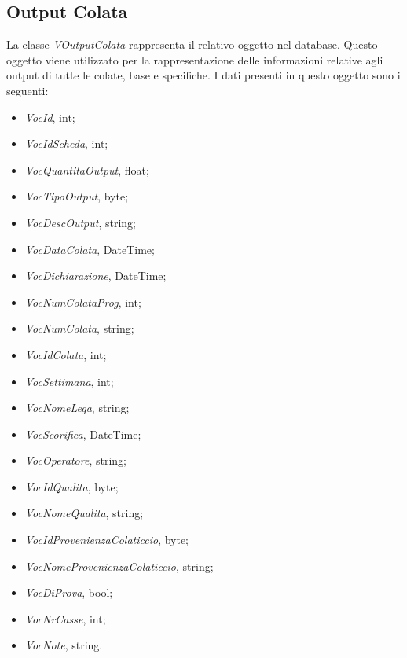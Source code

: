   \subsection{Output Colata}
  La classe \textit{VOutputColata} rappresenta il relativo oggetto nel database. Questo oggetto viene utilizzato per la
  rappresentazione delle informazioni relative agli output di tutte le colate, base e specifiche. I dati presenti in questo
  oggetto sono i seguenti:
  \begin{itemize}
    \item \textit{VocId}, int;
    \item \textit{VocIdScheda}, int;
    \item \textit{VocQuantitaOutput}, float;
    \item \textit{VocTipoOutput}, byte;
    \item \textit{VocDescOutput}, string;
    \item \textit{VocDataColata}, DateTime;
    \item \textit{VocDichiarazione}, DateTime;
    \item \textit{VocNumColataProg}, int;
    \item \textit{VocNumColata}, string;
    \item \textit{VocIdColata}, int;
    \item \textit{VocSettimana}, int;
    \item \textit{VocNomeLega}, string;
    \item \textit{VocScorifica}, DateTime;
    \item \textit{VocOperatore}, string;
    \item \textit{VocIdQualita}, byte;
    \item \textit{VocNomeQualita}, string;
    \item \textit{VocIdProvenienzaColaticcio}, byte;
    \item \textit{VocNomeProvenienzaColaticcio}, string;
    \item \textit{VocDiProva}, bool;
    \item \textit{VocNrCasse}, int;
    \item \textit{VocNote}, string.
  \end{itemize}
  

